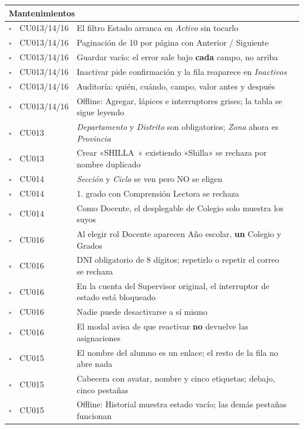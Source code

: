 \documentclass[11pt,a4paper]{article}
\newcommand{\ok}{$\square$}
\begin{document}
\begin{longtable}{|c|p{1.9cm}|p{6.1cm}|p{4.3cm}|}
\multicolumn{4}{|l|}{\cellcolor{grisclaro}\textbf{Mantenimientos}} \\ \hline
\ok & CU013/14/16 & El filtro Estado arranca en \emph{Activo} sin tocarlo & \\[0.5cm] \hline
\ok & CU013/14/16 & Paginación de 10 por página con Anterior / Siguiente & \\[0.5cm] \hline
\ok & CU013/14/16 & Guardar vacío: el error sale bajo \textbf{cada} campo, no arriba & \\[0.5cm] \hline
\ok & CU013/14/16 & Inactivar pide confirmación y la fila reaparece en \emph{Inactivos} & \\[0.5cm] \hline
\ok & CU013/14/16 & Auditoría: quién, cuándo, campo, valor antes y después & \\[0.5cm] \hline
\ok & CU013/14/16 & Offline: Agregar, lápices e interruptores grises; la tabla se sigue leyendo & \\[0.5cm] \hline
\ok & CU013 & \emph{Departamento} y \emph{Distrito} son obligatorios; \emph{Zona} ahora es \emph{Provincia} & \\[0.5cm] \hline
\ok & CU013 & Crear «SHILLA~» existiendo «Shilla» se rechaza por nombre duplicado & \\[0.5cm] \hline
\ok & CU014 & \emph{Sección} y \emph{Ciclo} se ven pero NO se eligen & \\[0.5cm] \hline
\ok & CU014 & 1.\textordmasculine{} grado con Comprensión Lectora se rechaza & \\[0.5cm] \hline
\ok & CU014 & Como Docente, el desplegable de Colegio solo muestra los suyos & \\[0.5cm] \hline
\ok & CU016 & Al elegir rol Docente aparecen Año escolar, \textbf{un} Colegio y Grados & \\[0.5cm] \hline
\ok & CU016 & DNI obligatorio de 8 dígitos; repetirlo o repetir el correo se rechaza & \\[0.5cm] \hline
\ok & CU016 & En la cuenta del Supervisor original, el interruptor de estado está bloqueado & \\[0.5cm] \hline
\ok & CU016 & Nadie puede desactivarse a sí mismo & \\[0.5cm] \hline
\ok & CU016 & El modal avisa de que reactivar \textbf{no} devuelve las asignaciones & \\[0.5cm] \hline
\ok & CU015 & El nombre del alumno es un enlace; el resto de la fila no abre nada & \\[0.5cm] \hline
\ok & CU015 & Cabecera con avatar, nombre y cinco etiquetas; debajo, cinco pestañas & \\[0.5cm] \hline
\ok & CU015 & Offline: Historial muestra estado vacío; las demás pestañas funcionan & \\[0.5cm] \hline


\end{longtable}
\end{document}

